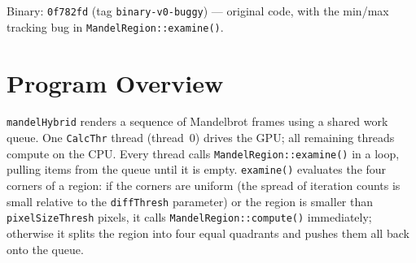 \documentclass[
	english,
	letterpaper, oneside
]{article}
\begin{document}
\templatePagecfg

\templateFinalcfg


\inserttitle

\begin{center}\small\textsf{%
Binary: \texttt{0f782fd} (tag \texttt{binary-v0-buggy}) --- original code, with the min/max tracking bug in \texttt{MandelRegion::examine()}.%
}\end{center}

\begin{abstract}
This report documents the instrumentation added to \texttt{mandelHybrid},
a hybrid CPU+GPU Mandelbrot set renderer that uses adaptive region splitting
as its load-balancing strategy. Two complementary profiling mechanisms were
introduced: NVTX (NVIDIA Tools Extension) annotations, which label regions
of CPU code so that Nsight Systems can render them as colored spans on a
per-thread timeline, and CUDA event timing, which uses GPU-side hardware
timestamps to measure kernel execution and device-to-host transfer time
independently of any CPU clock. The results show that the GPU thread is
approximately 40$\times$ faster per region than a single CPU thread,
naturally pulling 77\% of all work-queue items. All 12 threads (1 GPU + 11
CPU) finish within roughly 2 seconds of each other, demonstrating that the
dynamic work queue achieves good load balance. The dominant finding is that
\texttt{cudaMemcpy} spends 99.9\% of its reported time waiting for the GPU
kernel to finish—the actual device-to-host data transfer takes only 15~µs on
average, not 13.4~ms as the CUDA API summary suggests.
\end{abstract}

\section{Program Overview}

\texttt{mandelHybrid} renders a sequence of Mandelbrot frames using a
shared work queue. One \texttt{CalcThr} thread (thread~0) drives the GPU;
all remaining threads compute on the CPU. Every thread calls
\texttt{MandelRegion::examine()} in a loop, pulling items from the queue
until it is empty. \texttt{examine()} evaluates the four corners of a
region: if the corners are uniform (the spread of iteration counts
is small relative to the \texttt{diffThresh} parameter) or the region is
smaller than \texttt{pixelSizeThresh} pixels, it calls
\texttt{MandelRegion::compute()} immediately; otherwise it splits the
region into four equal quadrants and pushes them all back onto the queue.
\end{document}
